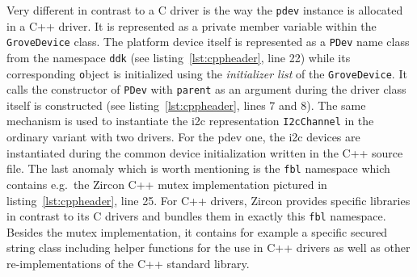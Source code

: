 Very different in contrast to a C driver is the way the \texttt{pdev} instance is allocated in a C++ driver.
It is represented as a private member variable within the \texttt{GroveDevice} class.
The platform device itself is represented as a \texttt{PDev} name class from the namespace \texttt{ddk} (see listing~\ref{lst:cppheader}, line 22) while its corresponding \texttt object is initialized using the \textit{initializer list} of the \texttt{GroveDevice}.
It calls the constructor of \texttt{PDev} with \texttt{parent} as an argument during the driver class itself is constructed (see listing~\ref{lst:cppheader}, lines 7 and 8).
The same mechanism is used to instantiate the \ac{i2c} representation \texttt{I2cChannel} in the ordinary variant with two drivers.
For the pdev one, the \ac{i2c} devices are instantiated during the common device initialization written in the C++ source file.
The last anomaly which is worth mentioning is the \texttt{fbl} namespace which contains e.g.\ the Zircon C++ mutex implementation pictured in listing~\ref{lst:cppheader}, line 25.
For C++ drivers, Zircon provides specific libraries in contrast to its C drivers and bundles them in exactly this \texttt{fbl} namespace.
Besides the mutex implementation, it contains for example a specific secured string class including helper functions for the use in C++ drivers as well as other re-implementations of the C++ standard library.

